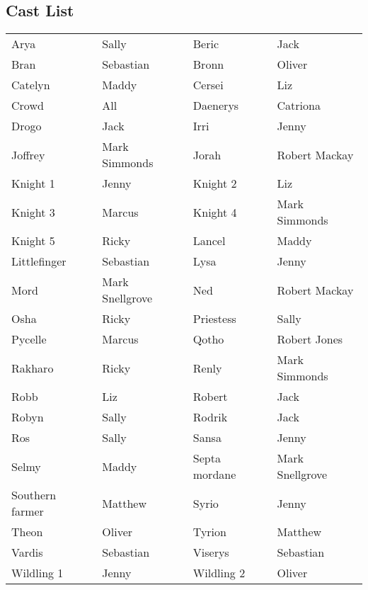 \subsection*{Cast List}
\begin{tabular}{ll|ll}\\
Arya & Sally &  Beric & Jack\\
Bran & Sebastian &  Bronn & Oliver\\
Catelyn & Maddy &  Cersei & Liz\\
Crowd & All &  Daenerys & Catriona\\
Drogo & Jack &  Irri & Jenny\\
Joffrey & Mark Simmonds &  Jorah & Robert Mackay\\
Knight 1 & Jenny &  Knight 2 & Liz\\
Knight 3 & Marcus &  Knight 4 & Mark Simmonds\\
Knight 5 & Ricky &  Lancel & Maddy\\
Littlefinger & Sebastian &  Lysa & Jenny\\
Mord & Mark Snellgrove &  Ned & Robert Mackay\\
Osha & Ricky &  Priestess & Sally\\
Pycelle & Marcus &  Qotho & Robert Jones\\
Rakharo & Ricky &  Renly & Mark Simmonds\\
Robb & Liz &  Robert & Jack\\
Robyn & Sally &  Rodrik & Jack\\
Ros & Sally &  Sansa & Jenny\\
Selmy & Maddy &  Septa mordane & Mark Snellgrove\\
Southern farmer & Matthew &  Syrio & Jenny\\
Theon & Oliver &  Tyrion & Matthew\\
Vardis & Sebastian &  Viserys & Sebastian\\
Wildling 1 & Jenny &  Wildling 2 & Oliver\\
\end{tabular}
